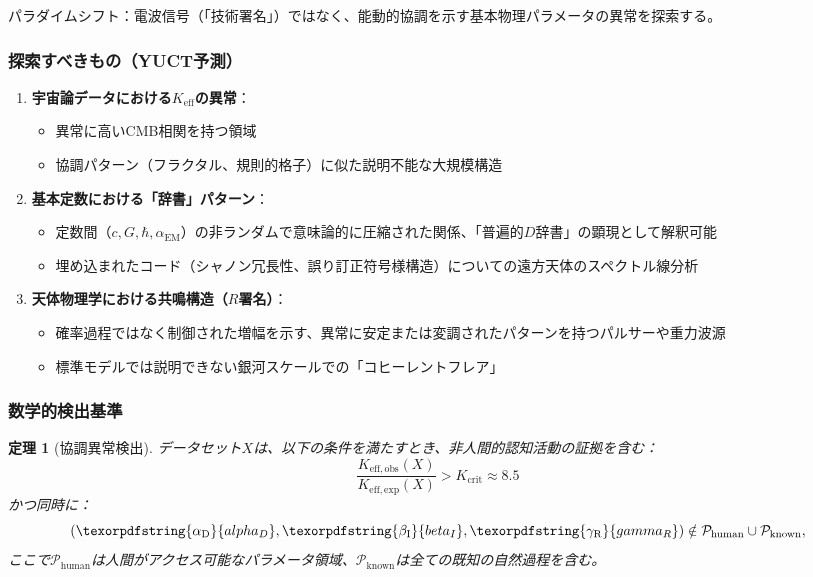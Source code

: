 \documentclass[11pt,a4paper]{article}
\newtheorem{theorem}{定理}
\DeclareRobustCommand{\alD}{\texorpdfstring{\ensuremath{\alpha_{\mathrm{D}}}}{alpha_D}}
\DeclareRobustCommand{\beI}{\texorpdfstring{\ensuremath{\beta_{\mathrm{I}}}}{beta_I}}
\DeclareRobustCommand{\gaR}{\texorpdfstring{\ensuremath{\gamma_{\mathrm{R}}}}{gamma_R}}
\newcommand{\eff}{\mathrm{eff}}
\newcommand{\Ke}{K_{\eff}}
\newcommand{\Keobs}{K_{\eff,\mathrm{obs}}}
\newcommand{\Keexp}{K_{\eff,\mathrm{exp}}}
\newcommand{\Kcrit}{K_{\mathrm{crit}}}
\begin{document}
	パラダイムシフト：電波信号（「技術署名」）ではなく、能動的協調を示す基本物理パラメータの異常を探索する。
	
	\subsubsection{探索すべきもの（YUCT予測）}
	
	\begin{enumerate}
		\item \textbf{宇宙論データにおける\(\Ke\)の異常}：
		\begin{itemize}
			\item 異常に高いCMB相関を持つ領域
			\item 協調パターン（フラクタル、規則的格子）に似た説明不能な大規模構造
		\end{itemize}
		
		\item \textbf{基本定数における「辞書」パターン}：
		\begin{itemize}
			\item 定数間（\(c, G, \hbar, \alpha_{\mathrm{EM}}\)）の非ランダムで意味論的に圧縮された関係、「普遍的\(D\)辞書」の顕現として解釈可能
			\item 埋め込まれたコード（シャノン冗長性、誤り訂正符号様構造）についての遠方天体のスペクトル線分析
		\end{itemize}
		
		\item \textbf{天体物理学における共鳴構造（\(R\)署名）}：
		\begin{itemize}
			\item 確率過程ではなく制御された増幅を示す、異常に安定または変調されたパターンを持つパルサーや重力波源
			\item 標準モデルでは説明できない銀河スケールでの「コヒーレントフレア」
		\end{itemize}
	\end{enumerate}
	
	\subsubsection{数学的検出基準}
	
	\begin{theorem}[協調異常検出]
		データセット\(X\)は、以下の条件を満たすとき、非人間的認知活動の証拠を含む：
		\[
		\frac{\Keobs(X)}{\Keexp(X)} > \Kcrit \approx 8.5
		\]
		かつ同時に：
		\[
		(\alD, \beI, \gaR) \notin \mathcal{P}_{\mathrm{human}} \cup \mathcal{P}_{\mathrm{known}},
		\]
		ここで\(\mathcal{P}_{\mathrm{human}}\)は人間がアクセス可能なパラメータ領域、\(\mathcal{P}_{\mathrm{known}}\)は全ての既知の自然過程を含む。
	\end{theorem}
	
\end{document}
